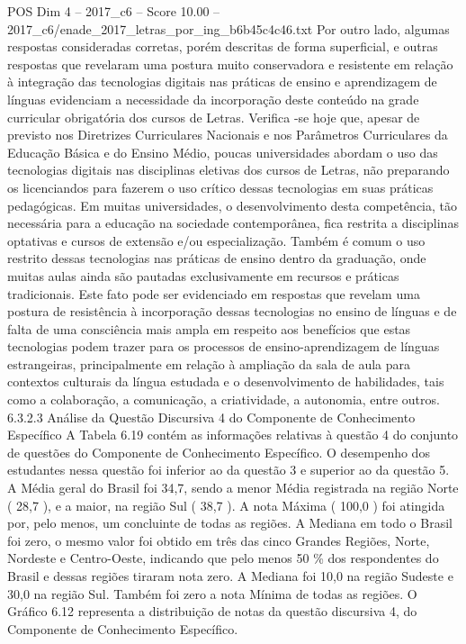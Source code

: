 \begin{textsample}{POS Dim 4 – 2017\_c6 – Score 10.00 – 2017\_c6/enade\_2017\_letras\_por\_ing\_b6b45c4c46.txt}
Por outro lado, algumas respostas consideradas corretas, porém descritas de forma superficial, e outras respostas que revelaram uma postura muito conservadora e resistente em relação à integração das tecnologias digitais nas práticas de ensino e aprendizagem de línguas evidenciam a necessidade da incorporação deste conteúdo na grade curricular obrigatória dos cursos de Letras.
Verifica -se hoje que, apesar de previsto nos Diretrizes Curriculares Nacionais e nos Parâmetros Curriculares da Educação Básica e do Ensino Médio, poucas universidades abordam o uso das tecnologias digitais nas disciplinas eletivas dos cursos de Letras, não preparando os licenciandos para fazerem o uso crítico dessas tecnologias em suas práticas pedagógicas.
Em muitas universidades, o desenvolvimento desta competência, tão necessária para a educação na sociedade contemporânea, fica restrita a disciplinas optativas e cursos de extensão e/ou especialização.
Também é comum o uso restrito dessas tecnologias nas práticas de ensino dentro da graduação, onde muitas aulas ainda são pautadas exclusivamente em recursos e práticas tradicionais.
Este fato pode ser evidenciado em respostas que revelam uma postura de resistência à incorporação dessas tecnologias no ensino de línguas e de falta de uma consciência mais ampla em respeito aos benefícios que estas tecnologias podem trazer para os processos de ensino-aprendizagem de línguas estrangeiras, principalmente em relação à ampliação da sala de aula para contextos culturais da língua estudada e o desenvolvimento de habilidades, tais como a colaboração, a comunicação, a criatividade, a autonomia, entre outros. 6.3.2.3 Análise da Questão Discursiva 4 do Componente de Conhecimento Específico A Tabela 6.19 contém as informações relativas à questão 4 do conjunto de questões do Componente de Conhecimento Específico.
O desempenho dos estudantes nessa questão foi inferior ao da questão 3 e superior ao da questão 5.
A Média geral do Brasil foi 34,7, sendo a menor Média registrada na região Norte ( 28,7 ), e a maior, na região Sul ( 38,7 ).
A nota Máxima ( 100,0 ) foi atingida por, pelo menos, um concluinte de todas as regiões.
A Mediana em todo o Brasil foi zero, o mesmo valor foi obtido em três das cinco Grandes Regiões, Norte, Nordeste e Centro-Oeste, indicando que pelo menos 50 \% dos respondentes do Brasil e dessas regiões tiraram nota zero.
A Mediana foi 10,0 na região Sudeste e 30,0 na região Sul.
Também foi zero a nota Mínima de todas as regiões.
O Gráfico 6.12 representa a distribuição de notas da questão discursiva 4, do Componente de Conhecimento Específico.

\end{textsample}
